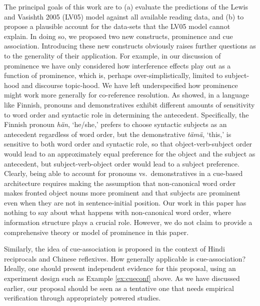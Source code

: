 \documentclass{cambridge7A}\usepackage[]{graphicx}\usepackage[]{color}
\newcommand{\revised}[1]{#1}
\begin{document}
\revised{The principal goals of this work are to (a) evaluate the predictions of the Lewis and Vasishth 2005 (LV05) model against all available reading data, and (b) to propose a plausible account for the data-sets that the LV05 model cannot explain. In doing so, we proposed two new constructs, prominence and cue association. Introducing these new constructs obviously raises further questions as to the generality of their application. For example, in our discussion of prominence we have only considered how interference effects play out as a function of prominence, which is, perhaps over-simplistically, limited to subject-hood and discourse topic-hood.
\label{prominencelimitationspageref}
We have left underspecified how prominence might work more generally for co-reference resolution. As \cite{kaiser2008interpreting} showed, in a language like Finnish, pronouns and demonstratives exhibit different amounts of sensitivity to word order and syntactic role in determining the antecedent. Specifically, the Finnish pronoun \textit{h\"an}, `he/she,' prefers to choose syntactic subjects as an antecedent regardless of word order, but the demonstrative \textit{t\"am\"a}, `this,' is sensitive to both word order and syntactic role, so that object-verb-subject order would lead to an approximately equal preference for the object and the subject as antecedent, but subject-verb-object order would lead to a subject preference. Clearly, being able to account for pronouns vs.\ demonstratives in a cue-based architecture requires making the assumption that non-canonical word order makes fronted object nouns more prominent and that subjects are prominent even when they are not in sentence-initial position. Our work in this paper has nothing to say about what happens with non-canonical word order, where information structure plays a crucial role. However, we do not claim to provide a comprehensive theory or model of prominence in this paper.} 

Similarly, the idea of cue-association is proposed in the context of Hindi reciprocals and Chinese reflexives. How generally applicable is cue-association? Ideally, one should present independent evidence for this proposal, using an experiment design such as Example \ref{ex:cueconf} above. As we have discussed earlier, our proposal should be seen as a tentative one that needs empirical verification through appropriately powered studies.
\end{document}
